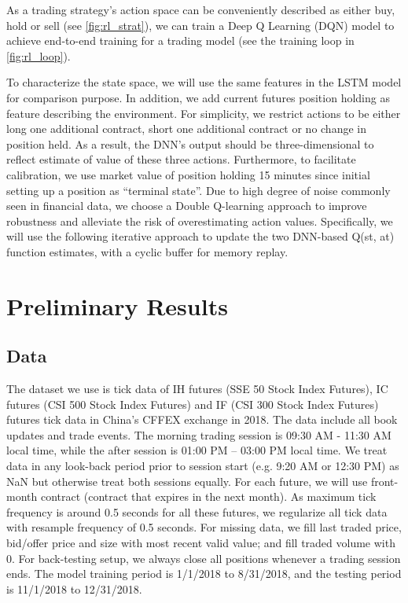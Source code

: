 \documentclass{article}
\begin{document}
As a trading strategy’s action space can be conveniently described as either buy, hold or sell (see \ref{fig:rl_strat}), we can train a Deep Q Learning (DQN) model to achieve end-to-end training for a trading model (see the training loop in \ref{fig:rl_loop}). 

To characterize the state space, we will use the same features in the LSTM model for comparison purpose. In addition, we add current futures position holding as feature describing the environment. For simplicity, we restrict actions to be either long one additional contract, short one additional contract or no change in position held. As a result, the DNN’s output should be three-dimensional to reflect estimate of value of these three actions. Furthermore, to facilitate calibration, we use market value of position holding 15 minutes since initial setting up a position as “terminal state”. Due to high degree of noise commonly seen in financial data, we choose a Double Q-learning approach to improve robustness and alleviate the risk of overestimating action values. Specifically, we will use the following iterative approach to update the two DNN-based Q(st, at) function estimates, with a cyclic buffer for memory replay. 

\section{Preliminary Results}

\subsection{Data}

The dataset we use is tick data of IH futures (SSE 50 Stock Index Futures), IC futures (CSI 500 Stock Index Futures) and IF (CSI 300 Stock Index Futures) futures tick data in China’s CFFEX exchange in 2018. The data include all book updates and trade events. The morning trading session is 09:30 AM - 11:30 AM local time, while the after session is 01:00 PM – 03:00 PM local time. We treat data in any look-back period prior to session start (e.g. 9:20 AM or 12:30 PM) as NaN but otherwise treat both sessions equally. For each future, we will use front-month contract (contract that expires in the next month). As maximum tick frequency is around 0.5 seconds for all these futures, we regularize all tick data with resample frequency of 0.5 seconds. For missing data, we fill last traded price, bid/offer price and size with most recent valid value; and fill traded volume with 0. For back-testing setup, we always close all positions whenever a trading session ends. The model training period is 1/1/2018 to 8/31/2018, and the testing period is 11/1/2018 to 12/31/2018.
\end{document}
